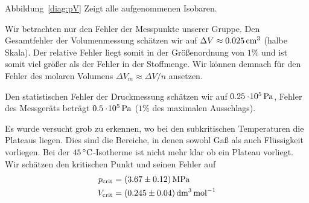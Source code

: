 Abbildung~\ref{diag:pV} Zeigt alle aufgenommenen Isobaren. 

Wir betrachten nur den Fehler der Messpunkte unserer Gruppe.
Den Gesamtfehler der Volumenmessung schätzen wir auf $\Delta V \approx \unit[0.025]{cm^3}$ (halbe Skala). Der relative Fehler liegt somit in der Größenordnung von $1\%$ und ist somit viel größer als der Fehler in der Stoffmenge. Wir können demnach für den Fehler des molaren Volumens $\Delta V_m \approx \Delta V / n$ ansetzen.

Den statistischen Fehler der Druckmessung schätzen wir auf $\unit[0.25 \e{5}]{Pa}$, Fehler des Messgeräts beträgt $\unit[0.5 \e5]{Pa}$ ($1\%$ des maximalen Ausschlags).

Es wurde versucht grob zu erkennen, wo bei den subkritischen Temperaturen die Plateaus liegen. Dies sind die Bereiche, in denen sowohl Gaß als auch Flüssigkeit vorliegen. Bei der $\unit[45]{ ^\circ C}$-Isotherme ist nicht mehr klar ob ein Plateau vorliegt. Wir schätzen den kritischen Punkt und seinen Fehler auf
\begin{align*}
    p_\mathrm{crit} &= \unit[(3.67 \pm 0.12)]{MPa} \\
    V_\mathrm{crit} &= \unit[(0.245 \pm 0.04)]{dm^3\, mol^{-1}}
\end{align*}


